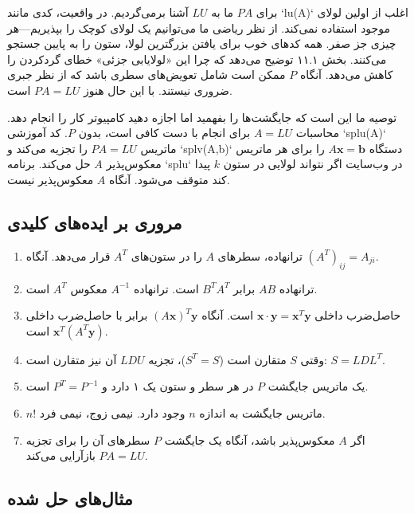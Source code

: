 \documentclass[12pt, a4paper]{book}
\begin{document}
	برای $PA$ ما به $LU$ آشنا برمی‌گردیم. در واقعیت، کدی مانند `lu(A)` اغلب از اولین لولای موجود استفاده نمی‌کند. از نظر ریاضی ما می‌توانیم یک لولای کوچک را بپذیریم—هر چیزی جز صفر. همه کدهای خوب برای یافتن بزرگترین لولا، ستون را به پایین جستجو می‌کنند.
	بخش ۱۱.۱ توضیح می‌دهد که چرا این «لولایابی جزئی» خطای گردکردن را کاهش می‌دهد. آنگاه $P$ ممکن است شامل تعویض‌های سطری باشد که از نظر جبری ضروری نیستند. با این حال هنوز $PA=LU$ است.
	
	توصیه ما این است که جایگشت‌ها را بفهمید اما اجازه دهید کامپیوتر کار را انجام دهد. محاسبات $A=LU$ برای انجام با دست کافی است، بدون $P$. کد آموزشی `splu(A)` ماتریس $PA=LU$ را تجزیه می‌کند و `splv(A,b)` دستگاه $A\mathbf{x}=\mathbf{b}$ را برای هر ماتریس معکوس‌پذیر $A$ حل می‌کند. برنامه `splu` در وب‌سایت اگر نتواند لولایی در ستون $k$ پیدا کند متوقف می‌شود. آنگاه $A$ معکوس‌پذیر نیست.
	
	\subsection*{مروری بر ایده‌های کلیدی}
	\begin{enumerate}
		\item ترانهاده، سطرهای $A$ را در ستون‌های $A^T$ قرار می‌دهد. آنگاه $(A^T)_{ij}=A_{ji}$.
		\item ترانهاده $AB$ برابر $B^TA^T$ است. ترانهاده $A^{-1}$ معکوس $A^T$ است.
		\item حاصل‌ضرب داخلی $\mathbf{x} \cdot \mathbf{y} = \mathbf{x}^T\mathbf{y}$ است. آنگاه $(A\mathbf{x})^T\mathbf{y}$ برابر با حاصل‌ضرب داخلی $\mathbf{x}^T(A^T\mathbf{y})$ است.
		\item وقتی $S$ متقارن است ($S^T=S$)، تجزیه $LDU$ آن نیز متقارن است: $S=LDL^T$.
		\item یک ماتریس جایگشت $P$ در هر سطر و ستون یک ۱ دارد و $P^T=P^{-1}$ است.
		\item $n!$ ماتریس جایگشت به اندازه $n$ وجود دارد. نیمی زوج، نیمی فرد.
		\item اگر $A$ معکوس‌پذیر باشد، آنگاه یک جایگشت $P$ سطرهای آن را برای تجزیه $PA=LU$ بازآرایی می‌کند.
	\end{enumerate}
	
	\subsection*{مثال‌های حل شده}
\end{document}
